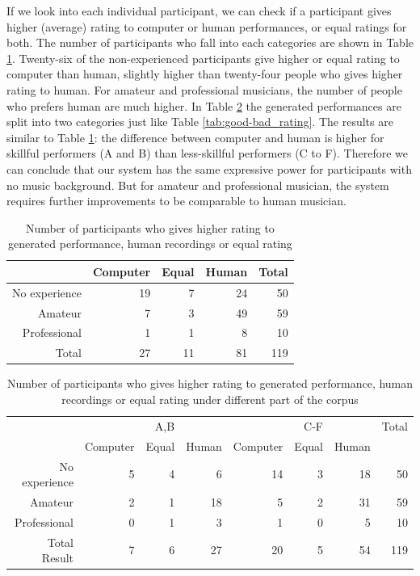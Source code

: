 If we look into each individual participant, we can check if a participant gives higher (average) rating to computer or human performances, or equal ratings for both. The number of participants who fall into each categories are shown in Table \ref{tab:avg_count}. Twenty-six of the non-experienced participants give higher or equal rating to computer than human, slightly higher than twenty-four people who gives higher rating to human. For amateur and professional musicians, the number of people who prefers human are much higher. In Table \ref{tab:good-bad_count}  the generated performances are split into  two categories just like Table \ref{tab:good-bad_rating}. The results are similar to Table \ref{tab:avg_count}: the difference between computer and human is higher for skillful performers (A and B) than less-skillful performers (C to F).
Therefore we can conclude that our system has the same expressive power for participants with no music background. But for amateur and professional musician, the system requires further improvements to be comparable to human musician.

\begin{table}
   \centering
   \caption{Number of participants who gives higher rating to generated performance, human recordings or equal rating}
   \label{tab:avg_count}
   \begin{tabular}{r|rrr|r}
      \hline
      &Computer&Equal&Human&Total\\
      \hline
      No experience&19&7&24&50\\
      Amateur&7&3&49&59\\
      Professional&1&1&8&10\\
      \hline
      Total&27&11&81&119\\
      \hline
   \end{tabular}
\end{table}

\begin{table}
   \centering
   \caption{Number of participants who gives higher rating to generated performance, human recordings or equal rating under different part of the corpus}
   \label{tab:good-bad_count}
   \begin{tabular}{r|rrr|rrr|r}
\hline
&&A,B&&&C-F&&Total\\
&Computer&Equal&Human&Computer&Equal&Human&\\
      \hline
No experience&5&4&6&14&3&18&50\\
Amateur&2&1&18&5&2&31&59\\
Professional&0&1&3&1&0&5&10\\
      \hline
Total Result&7&6&27&20&5&54&119\\
      \hline
   \end{tabular}
\end{table}


